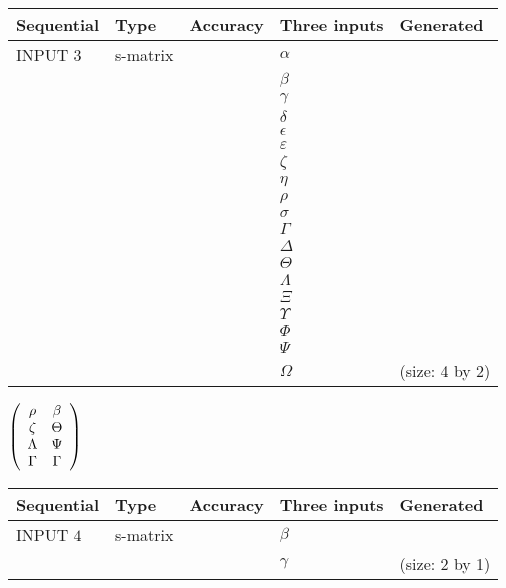 \documentclass[12pt]{article}
\begin{document}
  
\noindent\begin{tabular}{|l|l|l|l|l|}
\hline
 Sequential & Type & Accuracy & Three inputs & Generated \\ 
\hline
 
 
  INPUT $           3$ & s-matrix & & 
 $  \alpha $ & 
  \\
  & & & 
 $  \beta $ & 
  \\
  & & & 
 $  \gamma $ & 
  \\
  & & & 
 $  \delta $ & 
  \\
  & & & 
 $  \epsilon $ & 
  \\
  & & & 
 $  \varepsilon $ & 
  \\
  & & & 
 $                     \zeta $ & 
  \\
  & & & 
 $  \eta $ & 
  \\
  & & & 
 $  \rho $ & 
  \\
  & & & 
 $  \sigma $ & 
  \\
  & & & 
 $  \Gamma $ & 
  \\
  & & & 
 $  \Delta $ & 
  \\
  & & & 
 $  \Theta $ & 
  \\
  & & & 
 $  \Lambda $ & 
  \\
  & & & 
 $                     \Xi $ & 
  \\
  & & & 
 $  \Upsilon $ & 
  \\
  & & & 
 $  \Phi $ & 
  \\
  & & & 
 $  \Psi $ & 
  \\
  & & & 
 $  \Omega $ & 
  (size:           4 by           2)
 \\  \hline  
 \end{tabular}
   
   
 $  \left( \begin{array}
 {
 c
 c
 }
 \rho & 
 \beta \\ 
                    \zeta & 
 \Theta \\ 
 \Lambda & 
 \Psi \\ 
 \Gamma & 
 \Gamma
 \end{array} \right) $ 
  
  
\noindent\begin{tabular}{|l|l|l|l|l|}
\hline
 Sequential & Type & Accuracy & Three inputs & Generated \\ 
\hline
 
 
  INPUT $           4$ & s-matrix & & 
 $  \beta $ & 
  \\
  & & & 
 $  \gamma $ & 
  (size:           2 by           1)
 \\  \hline  
 \end{tabular}
   
\end{document}
